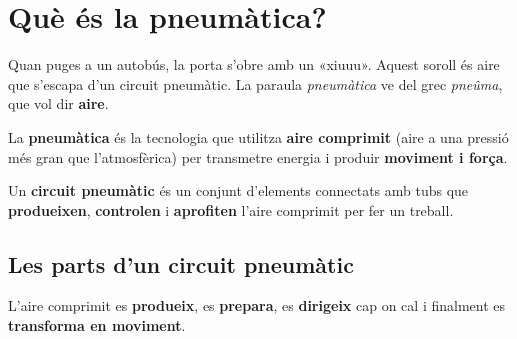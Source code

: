 \section{Què és la pneumàtica?}

Quan puges a un autobús, la porta s'obre amb un «xiuuu». Aquest soroll és aire que s'escapa d'un circuit pneumàtic. La paraula \emph{pneumàtica} ve del grec \emph{pneûma}, que vol dir \textbf{aire}.

\begin{idea}
La \textbf{pneumàtica} és la tecnologia que utilitza \textbf{aire comprimit} (aire a una pressió més gran que l'atmosfèrica) per transmetre energia i produir \textbf{moviment i força}.

Un \textbf{circuit pneumàtic} és un conjunt d'elements connectats amb tubs que \textbf{produeixen}, \textbf{controlen} i \textbf{aprofiten} l'aire comprimit per fer un treball.
\end{idea}

\subsection*{Les parts d'un circuit pneumàtic}

\begin{center}
\end{center}
\vspace{-0.3em}
{\small L'aire comprimit es \textbf{produeix}, es \textbf{prepara}, es \textbf{dirigeix} cap on cal i finalment es \textbf{transforma en moviment}.}

